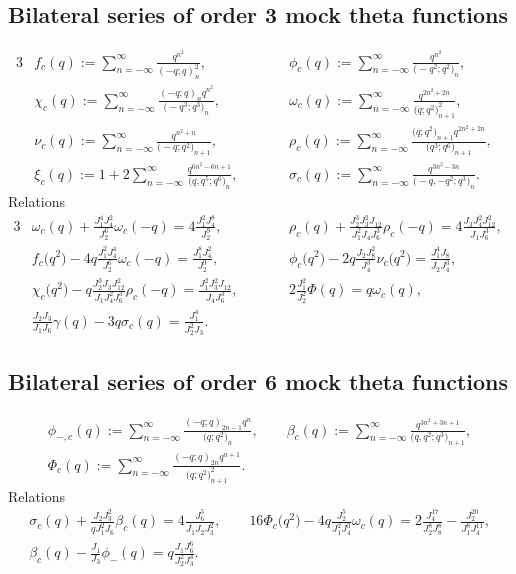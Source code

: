 \documentclass[pdftex]{sigma}
\numberwithin{equation}{section}
\begin{document}
\subsection{Bilateral series of order 3 mock theta functions}
\begin{alignat*}{3}
& f_c(q):= \sum_{n=-\infty}^{\infty}\frac{q^{n^2}}{(-q;q)_n^2},\qquad&&
 \phi_c(q):= \sum_{n=-\infty}^{\infty}\frac{q^{n^2}}{\bigl(-q^2;q^2\bigr)_n},&\\
&\chi_c(q):= \sum_{n=-\infty}^{\infty}\frac{(-q;q)_nq^{n^2}}{\bigl(-q^3;q^3\bigr)_n},\qquad&&
 \omega_c(q):= \sum_{n=-\infty}^{\infty}\frac{q^{2n^2+2n}}{\bigl(q;q^2\bigr)_{n+1}^2},&\\
&\nu_c(q):= \sum_{n=-\infty}^{\infty}\frac{q^{n^2+n}}{\bigl(-q;q^2\bigr)_{n+1}},\qquad&&
 \rho_c(q):= \sum_{n=-\infty}^{\infty}\frac{\bigl(q;q^2\bigr)_{n+1}q^{2n^2+2n}}{\bigl(q^3;q^6\bigr)_{n+1}},&\\
&\xi_c(q):= 1+2\sum_{n=-\infty}^{\infty}\frac{q^{6n^2-6n+1}}{\bigl(q,q^5;q^6\bigr)_n},\qquad&&
 \sigma_c(q):= \sum_{n=-\infty}^{\infty}\frac{q^{3n^2-3n}}{\bigl(-q,-q^2;q^3\bigr)_n}.&
\end{alignat*}
Relations
\begin{alignat*}{3}
 &\omega_c(q)+\frac{J_1^4J_4^2}{J_2^6}\omega_c(-q)=4\frac{J_1^2J_4^8}{J_2^9}, \qquad&&
 \rho_c(q)+\frac{J_2^3J_3^2J_{12}}{J_1^2J_4J_6^3}\rho_c(-q)=4\frac{J_3J_4^2J_{12}^2}{J_1J_6^3},&\\
& f_c\bigl(q^2\bigr)-4q\frac{J_1^2J_4^4}{J_2^6}\omega_c(-q)
=\frac{J_1^8J_4^2}{J_2^9},\qquad&&
 \phi_c\bigl(q^2\bigr)-2q\frac{J_2J_8^2}{J_4^3}\nu_c\bigl(q^2\bigr)
=\frac{J_1^4J_8}{J_2J_4^3}, &\\
& \chi_c\bigl(q^2\bigr)-q\frac{J_2^3J_3J_{12}^2}{J_1J_4^2J_6^3}\rho_c(-q)
=\frac{J_1^2J_3^2J_{12}}{J_4J_6^3},\qquad&&
 2\frac{J_1^2}{J_2^2}\varPhi(q)=q\omega_c(q),&\\
& \frac{J_2J_3}{J_1J_6}\gamma(q)-3q\sigma_c(q)=\frac{J_1^4}{J_2^2J_3}.&&&
\end{alignat*}

\subsection{Bilateral series of order 6 mock theta functions}
\begin{gather*}
\phi_{-,c}(q):= \sum_{n=-\infty}^{\infty}\frac{(-q;q)_{2n-1}q^n}{\bigl(q;q^2\bigr)_n},\qquad
 \beta_c(q):= \sum_{n=-\infty}^{\infty}\frac{q^{3n^2+3n+1}}{\bigl(q,q^2;q^3\bigr)_{n+1}},\\
\varPhi_c(q):= \sum_{n=-\infty}^{\infty}\frac{(-q;q)_{2n}q^{n+1}}{\bigl(q;q^2\bigr)_{n+1}^2}.
\end{gather*}
Relations
\begin{gather*}
  \sigma_c(q)+\frac{J_2J_3^2}{qJ_1^2J_6}\beta_c(q)=4\frac{J_6^5}{J_1J_2J_3^2},\qquad
 16\varPhi_c\bigl(q^2\bigr)-4q\frac{J_2^5}{J_1^2J_4^3}\omega_c(q)
=2\frac{J_4^{17}}{J_2^8J_8^8}-\frac{J_2^{20}}{J_1^8J_4^{11}},\\
 \beta_c(q)-\frac{J_1}{J_3}\phi_-(q)=q\frac{J_1J_6^6}{J_2^2J_3^4}.
\end{gather*}
\end{document}
